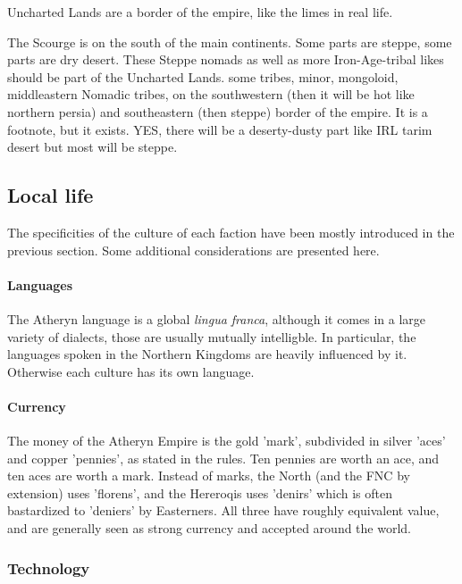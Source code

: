 Uncharted Lands are a border of the empire, like the limes in real life.

The Scourge is on the south of the main continents. Some parts are steppe, some parts are dry desert. These Steppe nomads as well as more Iron-Age-tribal likes should be part of the Uncharted Lands. some tribes, minor, mongoloid, middleastern
Nomadic tribes, on the southwestern (then it will be hot like northern persia) and southeastern (then steppe) border of the empire. It is a footnote, but it exists. YES, there will be a deserty-dusty part like IRL tarim desert but most will be steppe.







\subsection{Local life}



The specificities of the culture of each faction have been mostly introduced in the previous section. Some additional considerations are presented here.

\paragraph{Languages}

The Atheryn language is a global \textit{lingua franca}, although it comes in a large variety of dialects, those are usually mutually intelligble. In particular, the languages spoken in the Northern Kingdoms are heavily influenced by it. Otherwise each culture has its own language.

\paragraph{Currency}

The money of the Atheryn Empire is the gold 'mark', subdivided in silver 'aces' and copper 'pennies', as stated in the rules. Ten pennies are worth an ace, and ten aces are worth a mark. Instead of marks, the North (and the FNC by extension) uses 'florens', and the Hereroqis uses 'denirs' which is often bastardized to 'deniers' by Easterners. All three have roughly equivalent value, and are generally seen as strong currency and accepted around the world.


\subsubsection{Technology}

